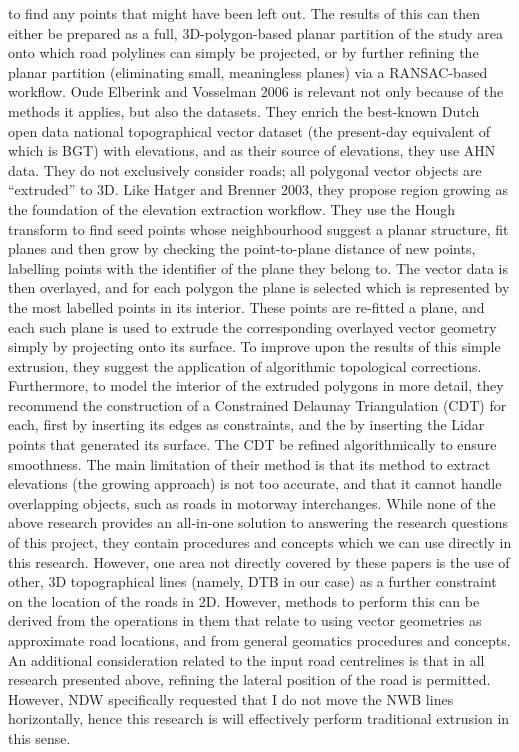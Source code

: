 to find any points that might have been left out. The results of this can then either be prepared as a full, 3D-polygon-based planar partition of the study area onto which road polylines can simply be projected, or by further refining the planar partition (eliminating small, meaningless planes) via a RANSAC-based workflow. Oude Elberink and Vosselman 2006 is relevant not only because of the methods it applies, but also the datasets. They enrich the best-known Dutch open data national topographical vector dataset (the present-day equivalent of which is BGT) with elevations, and as their source of elevations, they use AHN data. They do not exclusively consider roads; all polygonal vector objects are “extruded” to 3D. Like Hatger and Brenner 2003, they propose region growing as the foundation of the elevation extraction workflow. They use the Hough transform to find seed points whose neighbourhood suggest a planar structure, fit planes and then grow by checking the point-to-plane distance of new points, labelling points with the identifier of the plane they belong to. The vector data is then overlayed, and for each polygon the plane is selected which is represented by the most labelled points in its interior. These points are re-fitted a plane, and each such plane is used to extrude the corresponding overlayed vector geometry simply by projecting onto its surface. To improve upon the results of this simple extrusion, they suggest the application of algorithmic topological corrections. Furthermore, to model the interior of the extruded polygons in more detail, they recommend the construction of a Constrained Delaunay Triangulation (CDT) for each, first by inserting its edges as constraints, and the by inserting the Lidar points that generated its surface. The CDT be refined algorithmically to ensure smoothness. The main limitation of their method is that its method to extract elevations (the growing approach) is not too accurate, and that it cannot handle overlapping objects, such as roads in motorway interchanges.
While none of the above research provides an all-in-one solution to answering the research questions of this project, they contain procedures and concepts which we can use directly in this research. However, one area not directly covered by these papers is the use of other, 3D topographical lines (namely, DTB in our case) as a further constraint on the location of the roads in 2D. However, methods to perform this can be derived from the operations in them that relate to using vector geometries as approximate road locations, and from general geomatics procedures and concepts. An additional consideration related to the input road centrelines is that in all research presented above, refining the lateral position of the road is permitted. However, NDW specifically requested that I do not move the NWB lines horizontally, hence this research is will effectively perform traditional extrusion in this sense.